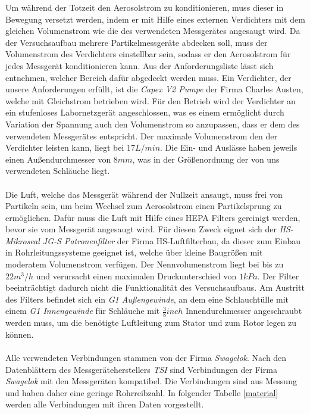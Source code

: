 Um w\"{a}hrend der Totzeit den Aerosolstrom zu konditionieren, muss dieser in Bewegung versetzt werden, indem er mit Hilfe eines externen Verdichters mit dem gleichen Volumenstrom wie die des verwendeten Messger\"{a}tes angesaugt wird. Da der Versuchsaufbau mehrere Partikelmessger\"{a}te abdecken soll, muss der Volumenstrom des Verdichters einstellbar sein, sodass er den Aerosolstrom f\"{u}r jedes Messger\"{a}t konditionieren kann. Aus der Anforderungsliste l\"{a}sst sich entnehmen, welcher Bereich daf\"{u}r abgedeckt werden muss. Ein Verdichter, der unsere Anforderungen erf\"{u}llt, ist die \textit{Capex V2 Pumpe} der Firma Charles Austen, welche mit Gleichstrom betrieben wird. F\"{u}r den Betrieb wird der Verdichter an ein stufenloses Labornetzger\"{a}t angeschlossen, was es einem erm\"{o}glicht durch Variation der Spannung auch den Volumenstrom so anzupassen, dass er dem des verwendeten Messger\"{a}tes entspricht. Der maximale Volumenstrom den der Verdichter leisten kann, liegt bei \(17 L/min\). Die Ein- und Ausl\"{a}sse haben jeweils einen Au{\ss}endurchmesser von \(8mm\), was in der Gr\"{o}{\ss}enordnung der von uns verwendeten Schl\"{a}uche liegt.
\\\\
Die Luft, welche das Messger\"{a}t w\"{a}hrend der Nullzeit ansaugt, muss frei von Partikeln sein, um beim Wechsel zum Aerosolstrom einen Partikelsprung zu erm\"{o}glichen. Daf\"{u}r muss die Luft mit Hilfe eines HEPA Filters gereinigt werden, bevor sie vom Messger\"{a}t angesaugt wird. F\"{u}r diesen Zweck eignet sich der \textit{HS-Mikroseal JG-S Patronenfilter} der Firma HS-Luftfilterbau, da dieser zum Einbau in Rohrleitungssysteme geeignet ist, welche \"{u}ber kleine Baugr\"{o}{\ss}en mit moderatem Volumenstrom verf\"{u}gen. Der Nennvolumenstrom liegt bei bis zu \(22m^3 / h\) und verursacht einen maximalen Druckunterschied von 
\(1 kPa\). Der Filter beeintr\"{a}chtigt dadurch nicht die Funktionalit\"{a}t des Versuchsaufbaus. Am Austritt des Filters befindet sich ein \textit{G1 Au{\ss}engewinde}, an dem eine Schlaucht\"{u}lle mit einem \textit{G1 Innengewinde} f\"{u}r Schl\"{a}uche mit \(\frac{3}{8} inch\) Innendurchmesser angeschraubt werden muss, um die ben\"{o}tigte Luftleitung zum Stator und zum Rotor legen zu k\"{o}nnen.
\\\\
Alle verwendeten Verbindungen stammen von der Firma \textit{Swagelok}. Nach den Datenbl\"{a}ttern des Messger\"{a}teherstellers \textit{TSI} sind Verbindungen der Firma \textit{Swagelok} mit den Messger\"{a}ten kompatibel. Die Verbindungen sind aus Messung und haben daher eine geringe Rohrreibzahl. In folgender Tabelle \ref{material} werden alle Verbindungen mit ihren Daten vorgestellt.
